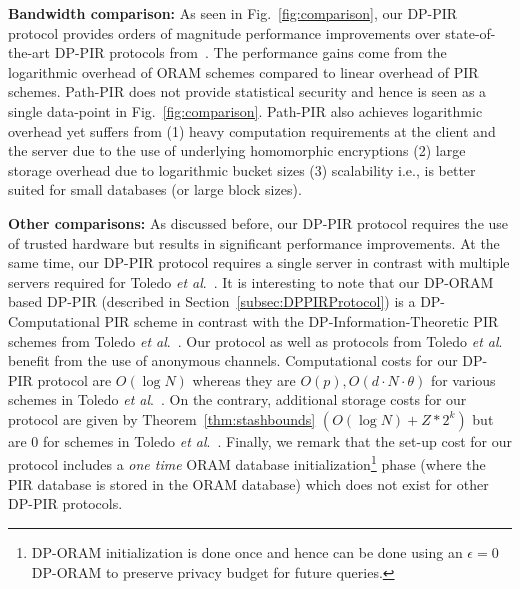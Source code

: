 \documentclass[USenglish,oneside,twocolumn]{article}
\newcommand{\etal}{\textit{et al}.}
\begin{document}
\textbf{Bandwidth comparison: }As seen in Fig.~\ref{fig:comparison}, our DP-PIR protocol provides orders of magnitude performance improvements over state-of-the-art DP-PIR protocols from~\cite{goldbergDPPIR}. The performance gains come from the logarithmic overhead of ORAM schemes compared to linear overhead of PIR schemes. Path-PIR does not provide statistical security and hence is seen as a single data-point in Fig.~\ref{fig:comparison}. Path-PIR also achieves logarithmic overhead yet suffers from (1) heavy computation requirements at the client and the server due to the use of underlying homomorphic encryptions (2) large storage overhead due to logarithmic bucket sizes (3) scalability i.e., is better suited for small databases (or large block sizes). 

\textbf{Other comparisons: }As discussed before, our DP-PIR protocol requires the use of trusted hardware but results in significant performance improvements. At the same time, our DP-PIR protocol requires a single server in contrast with multiple servers required for Toledo \etal~\cite{goldbergDPPIR}. It is interesting to note that our DP-ORAM based DP-PIR (described in Section~\ref{subsec:DPPIRProtocol}) is a DP-Computational PIR scheme in contrast with the DP-Information-Theoretic PIR schemes from Toledo \etal~\cite{goldbergDPPIR}. Our protocol as well as protocols from Toledo \etal~\cite{goldbergDPPIR} benefit from the use of anonymous channels. Computational costs for our DP-PIR protocol are $O(\log N)$ whereas they are $O(p), O(d \cdot N \cdot \theta)$ for various schemes in Toledo \etal~\cite{goldbergDPPIR}. On the contrary, additional storage costs for our protocol are given by Theorem~\ref{thm:stashbounds} $(O(\log N) + Z*2^k)$ but are 0 for schemes in Toledo \etal~\cite{goldbergDPPIR}. Finally, we remark that the set-up cost for our protocol includes a \textit{one time} ORAM database initialization\footnote{DP-ORAM initialization is done once and hence can be done using an $\epsilon=0$ DP-ORAM to preserve privacy budget for future queries.} phase (where the PIR database is stored in the ORAM database) which does not exist for other DP-PIR protocols.
\end{document}
